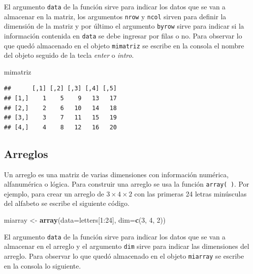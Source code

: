 \documentclass[10pt,]{krantz}
\makeatletter
\newenvironment{Shaded}{\begin{snugshade}}{\end{snugshade}}
\newcommand{\KeywordTok}[1]{\textcolor[rgb]{0.13,0.29,0.53}{\textbf{{#1}}}}
\newcommand{\DataTypeTok}[1]{\textcolor[rgb]{0.13,0.29,0.53}{{#1}}}
\newcommand{\DecValTok}[1]{\textcolor[rgb]{0.00,0.00,0.81}{{#1}}}
\newcommand{\StringTok}[1]{\textcolor[rgb]{0.31,0.60,0.02}{{#1}}}
\newcommand{\NormalTok}[1]{{#1}}
\newenvironment{kframe}{%
\medskip{}
\setlength{\fboxsep}{.8em}
 \def\at@end@of@kframe{}%
 \ifinner\ifhmode%
  \def\at@end@of@kframe{\end{minipage}}%
  \begin{minipage}{\columnwidth}%
 \fi\fi%
 \def\FrameCommand##1{\hskip\@totalleftmargin \hskip-\fboxsep
 \colorbox{shadecolor}{##1}\hskip-\fboxsep
     \hskip-\linewidth \hskip-\@totalleftmargin \hskip\columnwidth}%
 \MakeFramed {\advance\hsize-\width
   \@totalleftmargin\z@ \linewidth\hsize
   \@setminipage}}%
 {\par\unskip\endMakeFramed%
 \at@end@of@kframe}
\renewenvironment{Shaded}{\begin{kframe}}{\end{kframe}}
\makeatother
\begin{document}
El argumento \texttt{data} de la función sirve para indicar los datos
que se van a almacenar en la matriz, los argumentos \texttt{nrow} y
\texttt{ncol} sirven para definir la dimensión de la matriz y por último
el argumento \texttt{byrow} sirve para indicar si la información
contenida en \texttt{data} se debe ingresar por filas o no. Para
observar lo que quedó almacenado en el objeto \texttt{mimatriz} se
escribe en la consola el nombre del objeto seguido de la tecla
\textit{enter} o \textit{intro}.

\begin{Shaded}
\begin{Highlighting}[]
\NormalTok{mimatriz}
\end{Highlighting}
\end{Shaded}

\begin{verbatim}
##      [,1] [,2] [,3] [,4] [,5]
## [1,]    1    5    9   13   17
## [2,]    2    6   10   14   18
## [3,]    3    7   11   15   19
## [4,]    4    8   12   16   20
\end{verbatim}

\subsection{Arreglos}

Un arreglo  es una matriz de varias dimensiones con
información numérica, alfanumérica o lógica. Para construir una arreglo
se usa la función \texttt{array(\ )}. Por ejemplo, para crear un arreglo
de \(3 \times 4 \times 2\) con las primeras 24 letras minúsculas del
alfabeto se escribe el siguiente código.

\begin{Shaded}
\begin{Highlighting}[]
\NormalTok{miarray <-}\StringTok{ }\KeywordTok{array}\NormalTok{(}\DataTypeTok{data=}\NormalTok{letters[}\DecValTok{1}\NormalTok{:}\DecValTok{24}\NormalTok{], }\DataTypeTok{dim=}\KeywordTok{c}\NormalTok{(}\DecValTok{3}\NormalTok{, }\DecValTok{4}\NormalTok{, }\DecValTok{2}\NormalTok{))}
\end{Highlighting}
\end{Shaded}

El argumento \texttt{data} de la función sirve para indicar los datos
que se van a almacenar en el arreglo y el argumento \texttt{dim} sirve
para indicar las dimensiones del arreglo. Para observar lo que quedó
almacenado en el objeto \texttt{miarray} se escribe en la consola lo
siguiente.
\end{document}
